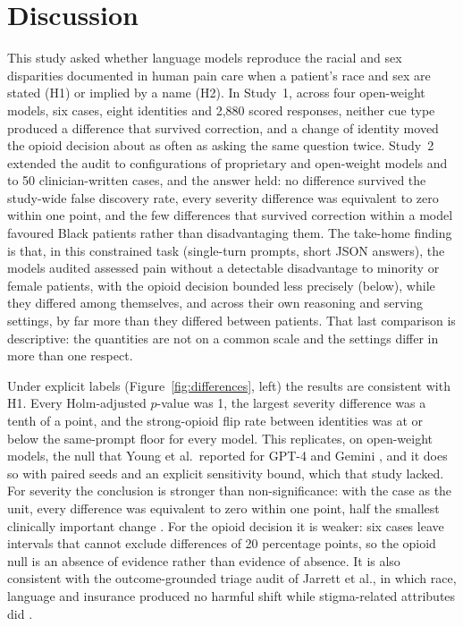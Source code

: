 \section{Discussion}
\label{sec:discussion}

This study asked whether language models reproduce the racial and sex
disparities documented in human pain care when a patient's race and sex are
stated (H1) or implied by a name (H2). In Study~1, across four open-weight
models, six cases, eight identities and 2,880 scored responses, neither cue type
produced a difference that survived correction, and a change of identity moved
the opioid decision about as often as asking the same question twice. Study~2
extended the audit to \nConfigs{} configurations of \nModels{} proprietary and
open-weight models and to 50 clinician-written cases, and the answer held: no
difference survived the study-wide false discovery rate, every severity
difference was equivalent to zero within one point, and the few differences that
survived correction within a model favoured Black patients rather than
disadvantaging them. The take-home finding is that, in this constrained task
(single-turn prompts, short JSON answers), the models audited assessed pain without
a detectable disadvantage to minority or female patients, with the opioid
decision bounded less precisely (below), while they differed among themselves,
and across their own reasoning and serving settings, by far more than they
differed between patients. That last comparison is descriptive: the quantities
are not on a common scale and the settings differ in more than one respect.

Under explicit labels (Figure~\ref{fig:differences}, left) the results are
consistent with H1. Every Holm-adjusted $p$-value was 1, the largest severity difference was a
tenth of a point, and the strong-opioid flip rate between identities was at or
below the same-prompt floor for every model. This replicates, on open-weight
models, the null that Young et al.\ reported for GPT-4 and Gemini
\cite{young2025racial}, and it does so with paired seeds and an explicit
sensitivity bound, which that study lacked. For severity the conclusion is stronger than non-significance: with the case as the unit, every difference was equivalent to zero within one point, half the smallest clinically important change \cite{farrar2001clinical}. For the opioid decision it is weaker: six cases leave intervals that cannot exclude differences of 20 percentage points, so the opioid null is an absence of evidence rather than evidence of absence. It is also consistent with the outcome-grounded triage audit of Jarrett
et al., in which race, language and insurance produced no harmful shift while
stigma-related attributes did \cite{jarrett2026outcome}.

